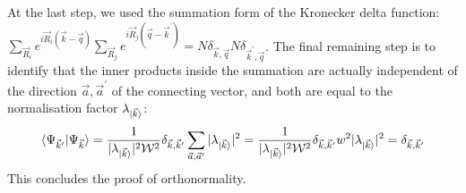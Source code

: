 \documentclass[prb]{revtex4-2}
\begin{document}
At the last step, we used the summation form of the Kronecker delta function: \(\sum_{\vec R_i}e^{i \vec R_i \left( \vec k - \vec q \right) }\sum_{\vec R_j}e^{i \vec R_j \left( \vec q - \vec k^\prime \right) } = N \delta_{\vec k,\vec q}N \delta_{\vec k^\prime,\vec q}\). The final remaining step is to identify that the inner products inside the summation are actually independent of the direction \(\vec a, \vec a^\prime\) of the connecting vector, and both are equal to the normalisation factor \(\lambda_{\ket{\vec k}}\):
\begin{equation}\begin{aligned}
	\braket{\Psi_{\vec k^\prime} | \Psi_{\vec k}} = \frac{1}{|\lambda_{\ket{\vec k}}|^2 \mathcal{W}^2 } \delta_{\vec k, \vec k^\prime}\sum_{\vec a,\vec a^\prime} |\lambda_{\ket{\vec k}}|^2 = \frac{1}{|\lambda_{\ket{\vec k}}|^2 \mathcal{W}^2 } \delta_{\vec k, \vec k^\prime}w^2 |\lambda_{\ket{\vec k}}|^2 = \delta_{\vec k, \vec k^\prime}
\end{aligned}\end{equation}
This concludes the proof of orthonormality.
\end{document}

